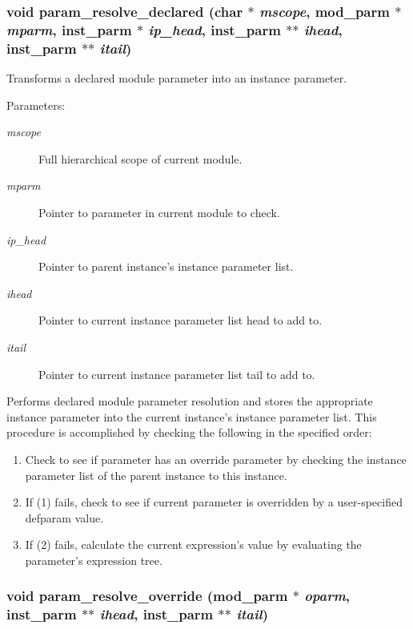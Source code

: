 \subsubsection{\setlength{\rightskip}{0pt plus 5cm}void param\_\-resolve\_\-declared (char $\ast$ {\em mscope}, {\bf mod\_\-parm} $\ast$ {\em mparm}, {\bf inst\_\-parm} $\ast$ {\em ip\_\-head}, {\bf inst\_\-parm} $\ast$$\ast$ {\em ihead}, {\bf inst\_\-parm} $\ast$$\ast$ {\em itail})}\label{param_8c_a17}


Transforms a declared module parameter into an instance parameter. 

\begin{Desc}
\item[Parameters:]
\begin{description}
\item[{\em mscope}]Full hierarchical scope of current module. \item[{\em mparm}]Pointer to parameter in current module to check. \item[{\em ip\_\-head}]Pointer to parent instance's instance parameter list. \item[{\em ihead}]Pointer to current instance parameter list head to add to. \item[{\em itail}]Pointer to current instance parameter list tail to add to.\end{description}
\end{Desc}
Performs declared module parameter resolution and stores the appropriate instance parameter into the current instance's instance parameter list. This procedure is accomplished by checking the following in the specified order:\begin{enumerate}
\item Check to see if parameter has an override parameter by checking the instance parameter list of the parent instance to this instance.\item If (1) fails, check to see if current parameter is overridden by a user-specified defparam value.\item If (2) fails, calculate the current expression's value by evaluating the parameter's expression tree. \end{enumerate}
\subsubsection{\setlength{\rightskip}{0pt plus 5cm}void param\_\-resolve\_\-override ({\bf mod\_\-parm} $\ast$ {\em oparm}, {\bf inst\_\-parm} $\ast$$\ast$ {\em ihead}, {\bf inst\_\-parm} $\ast$$\ast$ {\em itail})}\label{param_8c_a18}


